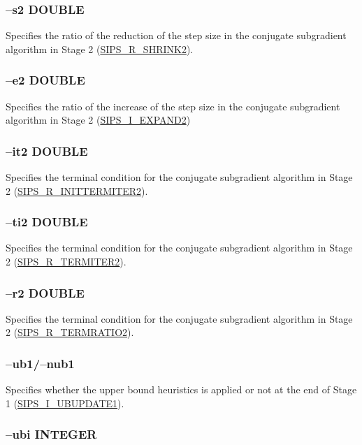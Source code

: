 \documentclass[a4paper]{book}
\begin{document}
\subsubsection{--s2 DOUBLE}

Specifies the ratio of the reduction of the step size in the conjugate subgradient algorithm in Stage 2
(\hyperlink{SHRINK2}{SIPS\_R\_SHRINK2}).

\subsubsection{--e2 DOUBLE}

Specifies the ratio of the increase of the step size in the conjugate subgradient algorithm in Stage 2
(\hyperlink{EXPAND2}{SIPS\_I\_EXPAND2})

\subsubsection{--it2 DOUBLE}

Specifies the terminal condition for the conjugate subgradient algorithm in Stage 2
(\hyperlink{INITTERMITER1}{SIPS\_R\_INITTERMITER2}).

\subsubsection{--ti2 DOUBLE}

Specifies the terminal condition for the conjugate subgradient algorithm in Stage 2
(\hyperlink{TERMITER2}{SIPS\_R\_TERMITER2}).

\subsubsection{--r2 DOUBLE}

Specifies the terminal condition for the conjugate subgradient algorithm in Stage 2
(\hyperlink{TERMRATIO2}{SIPS\_R\_TERMRATIO2}).

\subsubsection{--ub1/--nub1}

Specifies whether the upper bound heuristics is applied or not at the end of Stage 1
(\hyperlink{UBUPDATE1}{SIPS\_I\_UBUPDATE1}).

\subsubsection{--ubi INTEGER}
\end{document}
